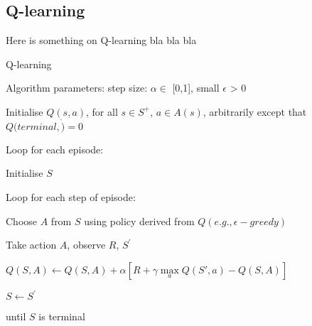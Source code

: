 \documentclass[../Head/Main.tex]{subfiles}
\begin{document}
\subsection{Q-learning}
Here is something on Q-learning
bla bla bla
\begin{Pseudo}{Q-learning}{}
\begin{Indentation}
    \item Algorithm parameters: step size: $\alpha\in$ [0,1], small  $\epsilon$ > 0 \vspace{-5pt}
    \item Initialise $Q(s,a)$, for all $s\in S^{+}$, $a\in A(s)$, arbitrarily except that $Q(terminal,\dot)=0$
    \item Loop for each episode: \vspace{-5pt}
    \begin{Indentation}
        \item Initialise $S$ \vspace{-5pt}
        \item Loop for each step of episode: \vspace{-5pt}
        \begin{Indentation}
            \item Choose $A$ from $S$ using policy derived from $Q(e.g., \epsilon-greedy)$ \vspace{-5pt}
            \item Take action $A$, observe $R$, $S^{'}$ \vspace{-5pt}
            \item $Q(S,A) \leftarrow Q(S,A) + \alpha \left[R + \gamma \max\limits_{a} Q(S',a) - Q(S,A)\right]$
            \item $S\leftarrow S^{'}$ \vspace{-5pt}
        \end{Indentation}
        \item until $S$ is terminal 
    \end{Indentation}
\end{Indentation}

\end{Pseudo}
\end{document}
